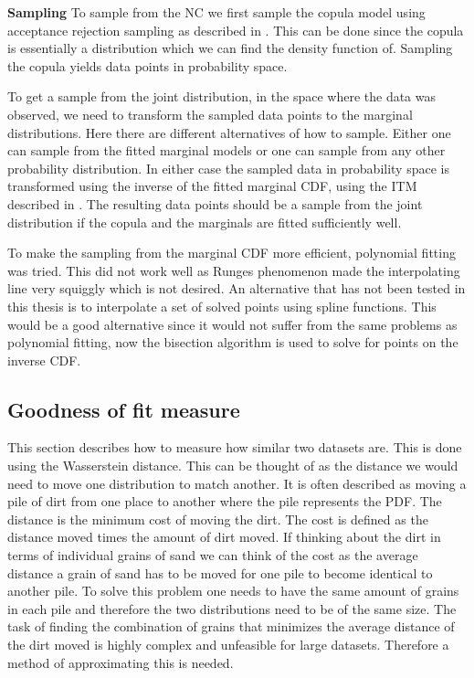 \textbf{Sampling}
To sample from the \gls{NC} we first sample the copula model using acceptance rejection sampling as described in . This can be done since the copula is essentially a distribution which we can find the density function of. Sampling the copula yields data points in probability space. 

To get a sample from the joint distribution, in the space where the data was observed, we need to transform the sampled data points to the marginal distributions. Here there are different alternatives of how to sample. Either one can sample from the fitted marginal models or one can sample from any other probability distribution. In either case the sampled data in probability space is transformed using the inverse of the fitted marginal \gls{CDF}, using the \gls{ITM} described in . The resulting data points should be a sample from the joint distribution if the copula and the marginals are fitted sufficiently well. 

\begin{generalinstructions}
     To make the sampling from the marginal \gls{CDF} more efficient, polynomial fitting was tried. This did not work well as Runges phenomenon made the interpolating line very squiggly which is not desired. An alternative that has not been tested in this thesis is to interpolate a set of solved points using spline functions. This would be a good alternative since it would not suffer from the same problems as polynomial fitting, now the bisection algorithm is used to solve for points on the inverse \gls{CDF}.   
\end{generalinstructions}



\subsection{Goodness of fit measure}\label{sec:GoodnessOfFit}
This section describes how to measure how similar two datasets are. This is done using the Wasserstein distance. This can be thought of as the distance we would need to move one distribution to match another. It is often described as moving a pile of dirt from one place to another where the pile represents the \gls{PDF}. The distance is the minimum cost of moving the dirt. The cost is defined as the distance moved times the amount of dirt moved. If thinking about the dirt in terms of individual grains of sand we can think of the cost as the average distance a grain of sand has to be moved for one pile to become identical to another pile. To solve this problem one needs to have the same amount of grains in each pile and therefore the two distributions need to be of the same size. The task of finding the combination of grains that minimizes the average distance of the dirt moved is highly complex and unfeasible for large datasets. Therefore a method of approximating this is needed. 

